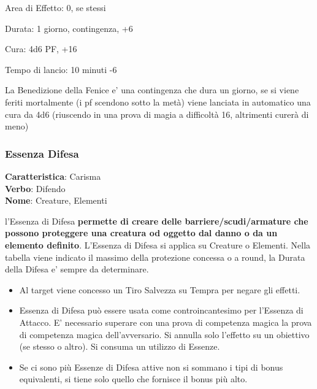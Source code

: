 \documentclass[a4paper,10 pt,twoside,openany]{book}
\begin{document}
Area di Effetto: 0, se stessi

Durata: 1 giorno, contingenza, +6

Cura: 4d6 PF, +16

Tempo di lancio: 10 minuti -6

La Benedizione della Fenice e' una contingenza che dura un giorno, se si viene feriti mortalmente (i pf scendono sotto la metà) viene lanciata in automatico una cura da 4d6 (riuscendo in una prova di magia a difficoltà 16, altrimenti curerà di meno)

\pagebreak

\subsubsection{Essenza Difesa}

\textbf{Caratteristica}: Carisma\\
\textbf{Verbo}: Difendo\\
\textbf{Nome}: Creature, Elementi\\

\label{essenza-difesa---magnetismo}

l'Essenza di Difesa \textbf{permette di creare delle barriere/scudi/armature che possono proteggere una creatura od oggetto dal danno o da un elemento definito}. L'Essenza di Difesa si applica su Creature o Elementi. Nella tabella viene indicato il massimo della protezione concessa o a round, la Durata della Difesa e' sempre da determinare.
\begin{itemize}
	\item
	Al target viene concesso un Tiro Salvezza su Tempra per negare gli effetti.
	\item
	Essenza di Difesa può essere usata come controincantesimo per l'Essenza di Attacco. E' necessario superare con una prova di competenza magica la prova di competenza magica dell'avversario. Si annulla solo l'effetto su un obiettivo (se stesso o altro). Si consuma un utilizzo di Essenze.
	\item
	Se ci sono più Essenze di Difesa attive non si sommano i tipi di bonus equivalenti, si tiene solo quello che fornisce il bonus più alto.
\end{itemize}
\end{document}
